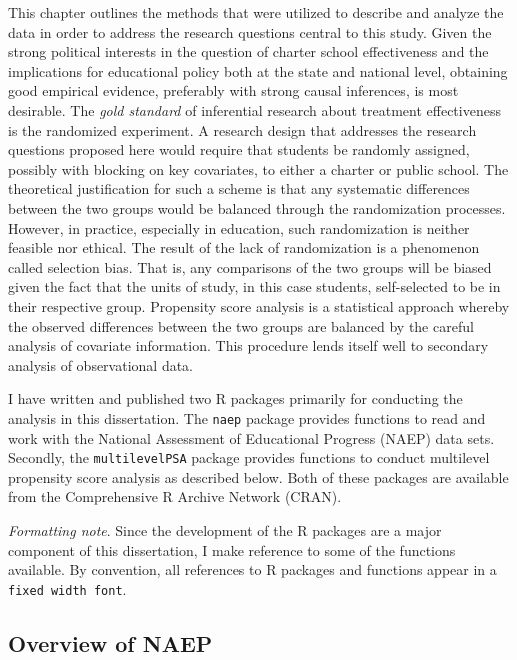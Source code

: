 \documentclass[letterpaper,12pt]{article} %
\begin{document}
This chapter outlines the methods that were utilized to describe and analyze the data in order to address the research questions central to this study. Given the strong political interests in the question of charter school effectiveness and the implications for educational policy both at the state and national level, obtaining good empirical evidence, preferably with strong causal inferences, is most desirable. The \textit{gold standard} of inferential research about treatment effectiveness is the randomized experiment. A research design that addresses the research questions proposed here would require that students be randomly assigned, possibly with blocking on key covariates, to either a charter or public school. The theoretical justification for such a scheme is that any systematic differences between the two groups would be balanced through the randomization processes. However, in practice, especially in education, such randomization is neither feasible nor ethical. The result of the lack of randomization is a phenomenon called selection bias. That is, any comparisons of the two groups will be biased given the fact that the units of study, in this case students, self-selected to be in their respective group. Propensity score analysis \cite{RosenbaumRubin1983} is a statistical approach whereby the observed differences between the two groups are balanced by the careful analysis of covariate information. This procedure lends itself well to secondary analysis of observational data.

I have written and published two R packages primarily for conducting the analysis in this dissertation. The \texttt{naep} package provides functions to read and work with the National Assessment of Educational Progress (NAEP) data sets. Secondly, the \texttt{multilevelPSA} package provides functions to conduct multilevel propensity score analysis as described below. Both of these packages are available from the Comprehensive R Archive Network (CRAN). 

\textit{Formatting note}. Since the development of the R packages are a major component of this dissertation, I make reference to some of the functions available. By convention, all references to R packages and functions appear in a \texttt{fixed width font}.

\subsection{Overview of NAEP}
\end{document}
